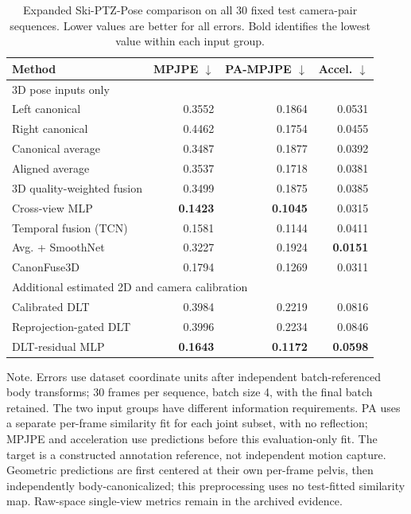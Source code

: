 \documentclass[preprint,12pt]{elsarticle}
\renewcommand{\textit}[1]{\textup{#1}}
\begin{document}
\begin{table}[t]
\centering
\caption{Expanded Ski-PTZ-Pose comparison on all 30 fixed test camera-pair sequences. Lower values are better for all errors. Bold identifies the lowest value within each input group.}
\label{tab:ski_poseptz_reference}
\small
\setlength{\tabcolsep}{3pt}
\begin{tabular}{@{}lrrr@{}}
\toprule
Method & MPJPE $\downarrow$ & PA-MPJPE $\downarrow$ & Accel. $\downarrow$ \\
\midrule
\multicolumn{4}{l}{\textit{3D pose inputs only}} \\
\midrule
Left canonical & 0.3552 & 0.1864 & 0.0531 \\
Right canonical & 0.4462 & 0.1754 & 0.0455 \\
Canonical average & 0.3487 & 0.1877 & 0.0392 \\
Aligned average & 0.3537 & 0.1718 & 0.0381 \\
3D quality-weighted fusion & 0.3499 & 0.1875 & 0.0385 \\
Cross-view MLP & \textbf{0.1423} & \textbf{0.1045} & 0.0315 \\
Temporal fusion (TCN) & 0.1581 & 0.1144 & 0.0411 \\
Avg. + SmoothNet~\cite{zeng2022smoothnet} & 0.3227 & 0.1924 & \textbf{0.0151} \\
CanonFuse3D & 0.1794 & 0.1269 & 0.0311 \\
\midrule
\multicolumn{4}{l}{\textit{Additional estimated 2D and camera calibration}} \\
\midrule
Calibrated DLT & 0.3984 & 0.2219 & 0.0816 \\
Reprojection-gated DLT & 0.3996 & 0.2234 & 0.0846 \\
DLT-residual MLP & \textbf{0.1643} & \textbf{0.1172} & \textbf{0.0598} \\
\bottomrule
\end{tabular}
\vspace{0.4em}
\begin{minipage}{0.98\linewidth}
\footnotesize\textit{Note.} Errors use dataset coordinate units after independent batch-referenced body transforms; 30 frames per sequence, batch size 4, with the final batch retained. The two input groups have different information requirements. PA uses a separate per-frame similarity fit for each joint subset, with no reflection; MPJPE and acceleration use predictions before this evaluation-only fit. The target is a constructed annotation reference, not independent motion capture. Geometric predictions are first centered at their own per-frame pelvis, then independently body-canonicalized; this preprocessing uses no test-fitted similarity map. Raw-space single-view metrics remain in the archived evidence.
\end{minipage}
\end{table}
\end{document}
